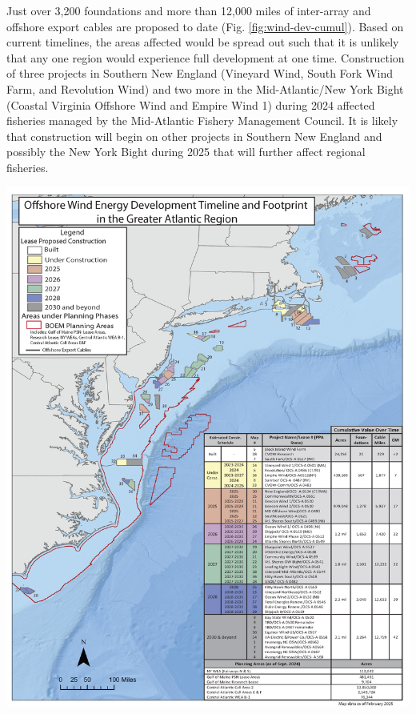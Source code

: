 \documentclass[
  10pt,
]{article}
\let\origfigure\figure
\let\endorigfigure\endfigure
\renewenvironment{figure}[1][2] {
    \expandafter\origfigure\expandafter[H]
} {
    \endorigfigure
}
\begin{document}
Just over 3,200 foundations and more than 12,000 miles of inter-array and offshore export cables are proposed to date (Fig. \ref{fig:wind-dev-cumul}). Based on current timelines, the areas affected would be spread out such that it is unlikely that any one region would experience full development at one time. Construction of three projects in Southern New England (Vineyard Wind, South Fork Wind Farm, and Revolution Wind) and two more in the Mid-Atlantic/New York Bight (Coastal Virginia Offshore Wind and Empire Wind 1) during 2024 affected fisheries managed by the Mid-Atlantic Fishery Management Council. It is likely that construction will begin on other projects in Southern New England and possibly the New York Bight during 2025 that will further affect regional fisheries.

\begin{figure}

{\centering \includegraphics[width=0.9\linewidth]{images/BothReports/UpdatedWind_AngelaSilva_2025} 

}

\caption{All Northeast Project areas by year construction ends (each project has a 2 year construction period).}\label{fig:wind-dev-cumul}
\end{figure}
\end{document}
